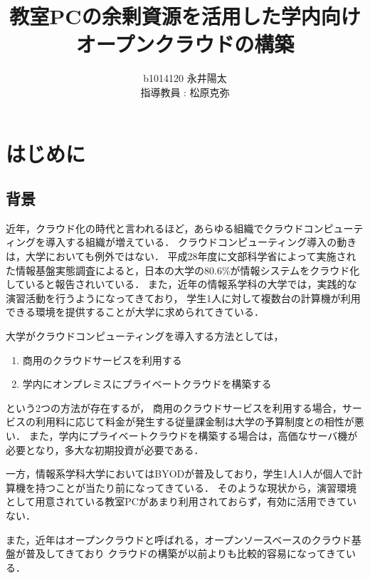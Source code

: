 \documentclass[10pt,a4paper]{jsarticle}
\author{%
b1014120 永井陽太\\指導教員 : 松原克弥
}
\title{教室PCの余剰資源を活用した学内向けオープンクラウドの構築}
\begin{document}
\maketitle

\section{はじめに}
\subsection{背景}
近年，クラウド化の時代と言われるほど，あらゆる組織でクラウドコンピューティングを導入する組織が増えている\cite{academiccloud}．
クラウドコンピューティング導入の動きは，大学においても例外ではない．
平成28年度に文部科学省によって実施された情報基盤実態調査によると，日本の大学の80.6\%が情報システムをクラウド化していると報告されいている\cite{SurveyOnActualStateOfAcademicInformationInfrastructure}．
また，近年の情報系学科の大学では，実践的な演習活動を行うようになってきており\cite{practicalict}，
学生1人に対して複数台の計算機が利用できる環境を提供することが大学に求められてきている．
\par 大学がクラウドコンピューティングを導入する方法としては，
\begin{enumerate}
	\item 商用のクラウドサービスを利用する
	\item 学内にオンプレミスにプライベートクラウドを構築する
\end{enumerate}
という2つの方法が存在するが，
商用のクラウドサービスを利用する場合，サービスの利用料に応じて料金が発生する従量課金制は大学の予算制度との相性が悪い．
また，学内にプライベートクラウドを構築する場合は，高価なサーバ機が必要となり，多大な初期投資が必要である．
\par 一方，情報系学科大学においてはBYODが普及しており，学生1人1人が個人で計算機を持つことが当たり前になってきている．
そのような現状から，演習環境として用意されている教室PCがあまり利用されておらず，有効に活用できていない．
\par また，近年はオープンクラウドと呼ばれる，オープンソースベースのクラウド基盤が普及してきており
クラウドの構築が以前よりも比較的容易になってきている．
\end{document}
